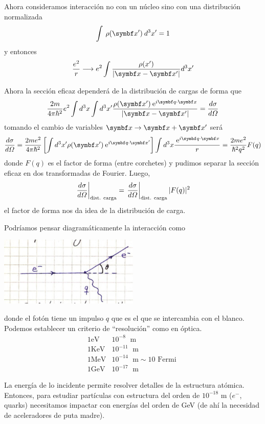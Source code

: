 \documentclass[10pt,oneside]{CBFT_book}
\begin{document}
Ahora consideramos interacción no con un núcleo sino con una distribución normalizada
\[
	\int \: \rho(\vb x') \: d^3x' = 1
\]
y entonces
\[
	\frac{e^2}{r} \longrightarrow e^2 \int \frac{\rho(x')}{|\vb x - \vb x'|} d^3x'
\]

Ahora la sección eficaz dependerá de la distribución de cargas de forma que
\[
	\frac{ 2 m }{ 4 \pi \hbar^2 } e^2 \int d^3x \int d^3x' 
	\frac{ \rho(\vbx') \euler^{ i \pe{q}{x} } }{|\vbx - \vbx'|} = \dtot{\sigma}{\Omega}
\]
tomando el cambio de variables $\vb x \to \vb x + \vb x'$ será
\[
	\dtot{\sigma}{\Omega} = \frac{2 m e^2}{ 4 \pi \hbar^2} \left[ \int d^3x' \rho(\vbx') \euler^{i \pe{q}{x'}} \right] 
	\int d^3x \frac{\euler^{i \pe{q}{x}}}{r} = \frac{ 2 m e^2 }{\hbar^2 q^2} F(q)
\]
donde $F(q)$ es el factor de forma (entre corchetes) y pudimos separar la sección eficaz en dos transformadas
de Fourier.
Luego,
\[
	\left. \frac{d^{\hspace{-0.05em}} {\sigma}}{d {\Omega}^{\hspace{-0.05em}}} \right|_{\text{dist. carga}} = 
	\left. \frac{d^{\hspace{-0.05em}} {\sigma}}{d {\Omega}^{\hspace{-0.05em}}} \right|_{\text{dist. carga}} |F(q)|^2
\]
el factor de forma nos da idea de la distribución de carga.

Podríamos pensar diagramáticamente la interacción como
	
	\includegraphics[width=0.5\textwidth]{images/fig_ft2_scattering_section_3.jpg}
	
donde el fotón tiene un impulso $q$ que es el que se intercambia con el blanco.
Podemos establecer un criterio de ``resolución'' como en óptica.
\begin{eqnarray*}
1 \text{eV} & 10^{-8} \; \text{ m}  \\
1 \text{KeV} & 10^{-11} \; \text{ m}  \\
1 \text{MeV} & 10^{-14} \; \text{ m}  \sim 10 \text{ Fermi } \\
1 \text{GeV} & 10^{-17} \; \text{ m}  
\end{eqnarray*}

La energía de lo incidente permite resolver detalles de la estructura atómica.
Entonces, para estudiar partículas con estructura del orden de $10^{-18}$ m ($e^-$, quarks)
necesitamos impactar con energías del orden de GeV (de ahí la necesidad de aceleradores de puta madre).
\end{document}
